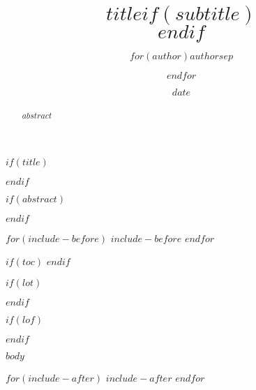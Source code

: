 \documentclass[11pt,a4paper]{article}
\title{$title$$if(subtitle)$\\\vspace{0.5em}{\large $subtitle$}$endif$}
\author{$for(author)$$author$$sep$ \and $endfor$}
\date{$date$}
\begin{document}
$if(title)$
  \maketitle
$endif$

$if(abstract)$
  \begin{abstract}
    $abstract$
  \end{abstract}
$endif$

$for(include-before)$
  $include-before$
$endfor$

$if(toc)$
{
  \hypersetup{linkcolor=black}
  \setcounter{tocdepth}{$toc-depth$}
  \tableofcontents
}
$endif$

$if(lot)$
  \listoftables
$endif$

$if(lof)$
  \listoffigures
$endif$

$body$

$for(include-after)$
  $include-after$
$endfor$
\end{document}
